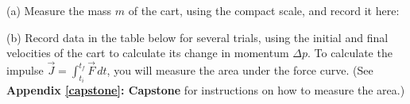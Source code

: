 \vspace{0.3cm}
{\par\centering {} \par}
\vspace{0.3cm}

(a) Measure the mass $m$ of the cart, using the compact scale, and record it here:
\answerspace{10mm}

(b) Record data in the table below for several trials, using the initial and final velocities of the cart to calculate its change in momentum $\Delta p$.  To calculate the impulse ${\vec  J}=\int_{t_{i}}^{t_{f}}{\vec  F}\,dt$, you will measure the area under the force curve.  (See \textbf{Appendix \ref{capstone}: Capstone} for instructions on how to measure the area.)

